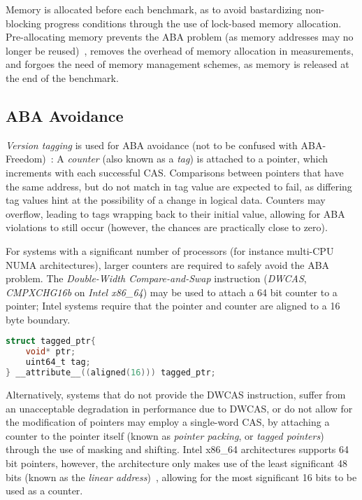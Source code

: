 Memory is allocated before each benchmark, as to avoid bastardizing
non-blocking progress conditions through the use of lock-based memory
allocation. Pre-allocating memory prevents the ABA problem (as memory addresses
may no longer be reused)~\citep{dechev2010understanding}, removes the overhead
of memory allocation in measurements, and forgoes the need of memory management
schemes, as memory is released at the end of the benchmark.

\subsection{ABA Avoidance}

\emph{Version tagging} is used for ABA avoidance (not to be confused with
ABA-Freedom)~\citep{dechev2010understanding}:
A \emph{counter} (also known as a \emph{tag}) is attached to a pointer, which increments with
each successful CAS. Comparisons between pointers that have the same address,
but do not match in tag value are expected to fail, as differing tag values hint
at the possibility of a change in logical data. Counters may overflow, leading to tags wrapping back
to their initial value, allowing for ABA violations to still occur (however,
the chances are practically close to zero).

For systems with a significant number of processors (for instance multi-CPU NUMA
architectures), larger counters are required  to safely avoid the ABA problem.
The \emph{Double-Width Compare-and-Swap} instruction (\emph{DWCAS}, \emph{CMPXCHG16b} on
\emph{Intel x86\_64}) may be used to attach a 64 bit counter to a pointer; Intel
systems require that the pointer and counter are aligned to a 16 byte boundary.

\begin{lstlisting}[language=C,caption={Struct aligned to 16 bytes, as required by the DWCAS instruction.}]
struct tagged_ptr{
    void* ptr;
    uint64_t tag;
} __attribute__((aligned(16))) tagged_ptr;
\end{lstlisting}

Alternatively, systems that do not provide the DWCAS instruction, suffer from
an unacceptable degradation in performance due to DWCAS, or do not allow for
the modification of pointers may employ a single-word CAS, by attaching a
counter to the pointer itself (known as \emph{pointer packing}, or \emph{tagged
pointers}) through the use of masking and shifting. Intel x86\_64 architectures supports 64 bit pointers, however, the
architecture only makes use of the least significant 48 bits (known as the
\emph{linear address})~\citep[Section~3.3.7.1]{intel2021system}, allowing for
the most significant 16 bits to be used as a counter.

